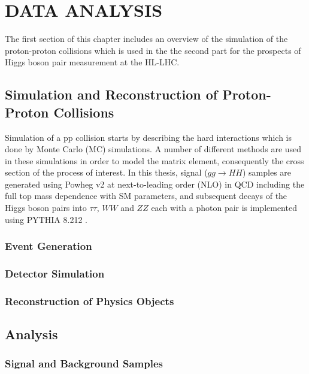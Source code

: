 \chapter{DATA ANALYSIS}\label{ch3}

The first section of this chapter includes an overview of the simulation of the proton-proton collisions which is used in the the second part for the prospects of Higgs boson pair measurement at the HL-LHC.

\section{Simulation and Reconstruction of Proton-Proton Collisions}

Simulation of a pp collision starts by describing the hard interactions which is done by Monte Carlo (MC) simulations. A number of different methods are used in these simulations in order to model the matrix element, consequently the cross section of the process of interest. In this thesis, signal ($gg \rightarrow HH$) samples are generated using Powheg v2 \cite{Nason2004, Frixione2007, Alioli2010, Heinrich2019} at next-to-leading order (NLO) in QCD including the full top mass dependence with SM parameters, and subsequent decays of the Higgs boson pairs into $\tau\tau$, $WW$ and $ZZ$ each with a photon pair is implemented using PYTHIA 8.212 \cite{Sjstrand2015}.

\subsection{Event Generation}

\subsection{Detector Simulation}

\subsection{Reconstruction of Physics Objects}

\section{Analysis}

\subsection{Signal and Background Samples}

